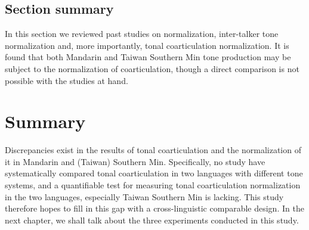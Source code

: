 \subsection{Section summary}
In this section we reviewed past studies on normalization, inter-talker tone normalization and, more importantly, tonal coarticulation normalization. It is found that both Mandarin and Taiwan Southern Min tone production may be subject to the normalization of coarticulation, though a direct comparison is not possible with the studies at hand.

\section{Summary}
Discrepancies exist in the results of tonal coarticulation and the normalization of it in Mandarin and (Taiwan) Southern Min. Specifically, no study have systematically compared tonal coarticulation in two languages with different tone systems, and a quantifiable test for measuring tonal coarticulation normalization in the two languages, especially Taiwan Southern Min is lacking. This study therefore hopes to fill in this gap with a cross-linguistic comparable design. In the next chapter, we shall talk about the three experiments conducted in this study.